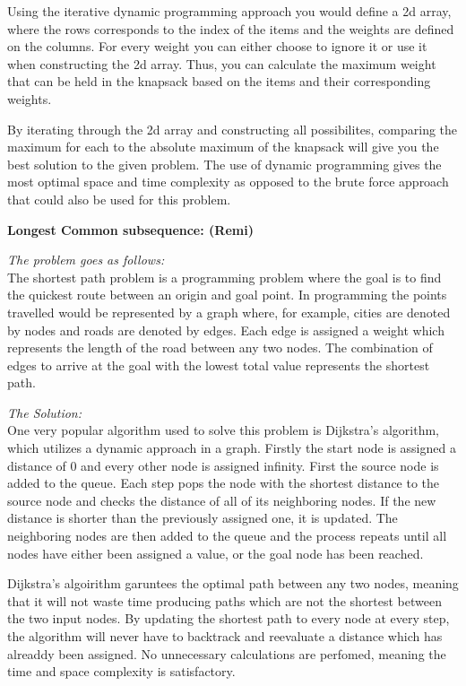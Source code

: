 \documentclass{article}
\begin{document}
Using the iterative dynamic programming approach you would define a 2d array,
where the rows corresponds to the index of the items and the weights are defined
on the columns. For every weight you can either choose to ignore it or use it
when constructing the 2d array. Thus, you can calculate the maximum weight
that can be held in the knapsack based on the items and their corresponding
weights.

By iterating through the 2d array and constructing all possibilites, comparing
the maximum for each to the absolute maximum of the knapsack will give you 
the best solution to the given problem. The use of dynamic programming gives
the most optimal space and time complexity as opposed to the brute force
approach that could also be used for this problem.

\bigskip

\noindent \textbf{Longest Common subsequence: (Remi)} 

\noindent \textit{The problem goes as follows:} \\

The shortest path problem is a programming problem where the goal is to find 
the quickest route between an origin and goal point. In programming the points
travelled would be represented by a graph where, for example, cities are denoted
by nodes and roads are denoted by edges. Each edge is assigned a weight which 
represents the length of the road between any two nodes. The combination of edges 
to arrive at the goal with the lowest total value represents the shortest path.

\medskip

\noindent \textit{The Solution:} \\

One very popular algorithm used to solve this problem is Dijkstra's algorithm, 
which utilizes a dynamic approach in a graph. Firstly the start node is assigned 
a distance of 0 and every other node is assigned infinity. First the source node
is added to the queue. Each step pops the node with the shortest distance to the
source node and checks the distance of all of its neighboring nodes. If the 
new distance is shorter than the previously assigned one, it is updated. The 
neighboring nodes are then added to the queue and the process repeats until 
all nodes have either been assigned a value, or the goal node has been reached.

Dijkstra's algoirithm garuntees the optimal path between any two nodes, meaning 
that it will not waste time producing paths which are not the shortest between
the two input nodes. By updating the shortest path to every node at every step, 
the algorithm will never have to backtrack and reevaluate a distance which
has alreaddy been assigned. No unnecessary calculations are perfomed, meaning 
the time and space complexity is satisfactory.
\end{document}
